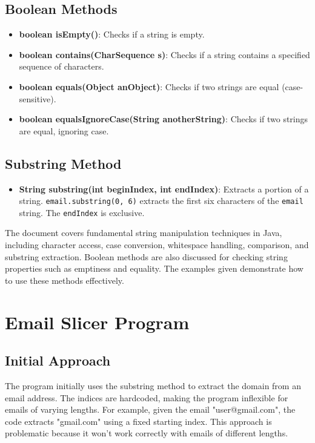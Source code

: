 \documentclass{article}
\begin{document}
\subsection{Boolean Methods}

\begin{itemize}
    \item \textbf{boolean isEmpty()}: Checks if a string is empty.
    \item \textbf{boolean contains(CharSequence s)}: Checks if a string contains a specified sequence of characters.
    \item \textbf{boolean equals(Object anObject)}: Checks if two strings are equal (case-sensitive).
    \item \textbf{boolean equalsIgnoreCase(String anotherString)}: Checks if two strings are equal, ignoring case.
\end{itemize}


\subsection{Substring Method}

\begin{itemize}
    \item \textbf{String substring(int beginIndex, int endIndex)}: Extracts a portion of a string.  \texttt{email.substring(0, 6)} extracts the first six characters of the \texttt{email} string. The \texttt{endIndex} is exclusive.
\end{itemize}

The document covers fundamental string manipulation techniques in Java, including character access, case conversion, whitespace handling, comparison, and substring extraction.  Boolean methods are also discussed for checking string properties such as emptiness and equality.  The examples given demonstrate how to use these methods effectively.


\section{Email Slicer Program}

\subsection{Initial Approach}

The program initially uses the substring method to extract the domain from an email address.  The indices are hardcoded, making the program inflexible for emails of varying lengths.  For example, given the email "user@gmail.com", the code extracts "gmail.com" using a fixed starting index.  This approach is problematic because it won't work correctly with emails of different lengths.
\end{document}
